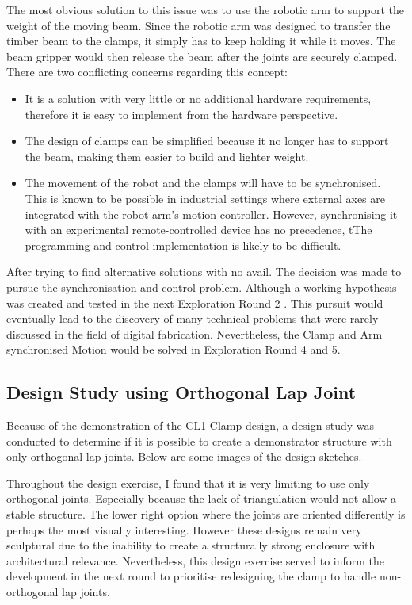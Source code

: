 The most obvious solution to this issue was to use the robotic arm to support the weight of the moving beam. Since the robotic arm was designed to transfer the timber beam to the clamps, it simply has to keep holding it while it moves. The beam gripper would then release the beam after the joints are securely clamped. There are two conflicting concerns regarding this concept:
\begin{itemize}
    \item It is a solution with very little or no additional hardware requirements, therefore it is easy to implement from the hardware perspective.
    \item The design of clamps can be simplified because it no longer has to support the beam, making them easier to build and lighter weight.
    \item The movement of the robot and the clamps will have to be synchronised. This is known to be possible in industrial settings where external axes are integrated with the robot arm’s motion controller. However, synchronising it with an experimental remote-controlled device has no precedence, tThe programming and control implementation is likely to be difficult.
\end{itemize}
After trying to find alternative solutions with no avail. The decision was made to pursue the synchronisation and control problem. Although a working hypothesis was created and tested in the next Exploration Round 2 . This pursuit would eventually lead to the discovery of many technical problems that were rarely discussed in the field of digital fabrication. Nevertheless, the Clamp and Arm synchronised Motion would be solved in Exploration Round 4 and 5.

\subsection{Design Study using Orthogonal Lap Joint}
\label{subsection:exploration_1_design_study_using_orthogonal_lap_joint}

Because of the demonstration of the CL1 Clamp design, a design study was conducted to determine if it is possible to create a demonstrator structure with only orthogonal lap joints. Below are some images of the design sketches.  


Throughout the design exercise, I found that it is very limiting to use only orthogonal joints. Especially because the lack of triangulation would not allow a stable structure. The lower right option where the joints are oriented differently is perhaps the most visually interesting. However these designs remain very sculptural due to the inability to create a structurally strong enclosure with architectural relevance. 
Nevertheless, this design exercise served to inform the development in the next round to prioritise redesigning the clamp to handle non-orthogonal lap joints.
